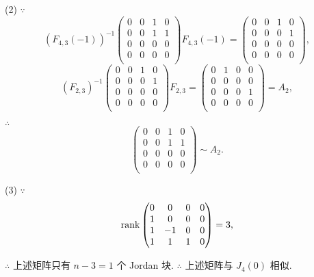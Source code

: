 \documentclass{ctexart}
\begin{document}
\begin{solution}
    (2) $\because$
    \[(F_{4,3}(-1))^{-1}\begin{pmatrix}
        0 & 0 & 1 & 0 \\
        0 & 0 & 1 & 1 \\
        0 & 0 & 0 & 0 \\
        0 & 0 & 0 & 0 \\
    \end{pmatrix}F_{4,3}(-1)=\begin{pmatrix}
        0 & 0 & 1 & 0 \\
        0 & 0 & 0 & 1 \\
        0 & 0 & 0 & 0 \\
        0 & 0 & 0 & 0 \\
    \end{pmatrix},\]
    \[(F_{2,3})^{-1}\begin{pmatrix}
        0 & 0 & 1 & 0 \\
        0 & 0 & 0 & 1 \\
        0 & 0 & 0 & 0 \\
        0 & 0 & 0 & 0 \\
    \end{pmatrix}F_{2,3}=\begin{pmatrix}
        0 & 1 & 0 & 0 \\
        0 & 0 & 0 & 0 \\
        0 & 0 & 0 & 1 \\
        0 & 0 & 0 & 0 \\
    \end{pmatrix}=A_2,\]

    $\therefore$
    \[\begin{pmatrix}
        0 & 0 & 1 & 0 \\
        0 & 0 & 1 & 1 \\
        0 & 0 & 0 & 0 \\
        0 & 0 & 0 & 0 \\
    \end{pmatrix}\sim A_2.\]

    (3) $\because$
    \[\operatorname{rank} \begin{pmatrix}
        0 & 0 & 0 & 0 \\
        1 & 0 & 0 & 0 \\
        1 & -1 & 0 & 0 \\
        1 & 1 & 1 & 0 \\
    \end{pmatrix}=3,\]

    $\therefore$ 上述矩阵只有 $n-3=1$ 个 Jordan 块. $\therefore$ 上述矩阵与 $J_4(0)$ 相似.


\end{solution}
\end{document}
